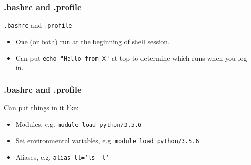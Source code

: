 \documentclass{beamer}
\newcommand{\code}[1]{\colorbox{codegray}{\texttt{#1}}}
\begin{document}

\begin{frame}
\frametitle{.bashrc and .profile}
\code{.bashrc} and \code{.profile}
\bigskip
\begin{itemize}
    \item One (or both) run at the beginning of shell session.
    \bigskip
    \pause
    \item Can put \code{echo "Hello from X"} at top to determine which runs when you log in.
\end{itemize}
\end{frame}


\begin{frame}
\frametitle{.bashrc and .profile}
Can put things in it like:
\bigskip
\begin{itemize}
    \item Modules, e.g. \code{module load python/3.5.6}
    \bigskip
    \pause
    \item Set environmental variables, e.g. \code{module load python/3.5.6}
    \pause
    \bigskip
    \item Aliases, e.g. \code{alias ll='ls -l'}
\end{itemize}
\end{frame}
\end{document}
